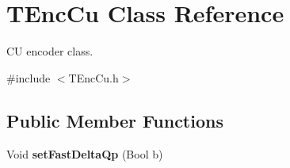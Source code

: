 \hypertarget{class_t_enc_cu}{}\section{T\+Enc\+Cu Class Reference}
\label{class_t_enc_cu}


CU encoder class.  




{\ttfamily \#include $<$T\+Enc\+Cu.\+h$>$}

\subsection*{Public Member Functions}
\begin{DoxyCompactItemize}
\item 
\mbox{\label{class_t_enc_cu_af63ed88ea828da1076f92c03b80b9fdb}} 
Void {\bfseries set\+Fast\+Delta\+Qp} (Bool b)
\end{DoxyCompactItemize}
